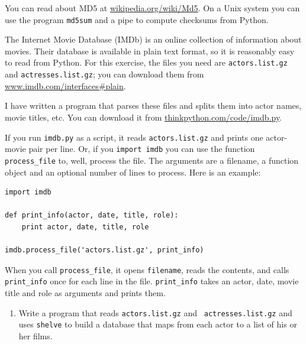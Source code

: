 \documentclass[10pt]{book}
\begin{document}
{\begin{ex}
\begin{enumerate}
You can read about MD5 at \url{wikipedia.org/wiki/Md5}.  On
a Unix system you can use the program {\tt md5sum} and a pipe to
compute checksums from Python.


\end{enumerate}

\end{ex}


\begin{ex}


The Internet Movie Database (IMDb) is an online collection of
information about movies.  Their database is available
in plain text format, so it is reasonably easy to read from
Python.  For this exercise, the files you need
are {\tt actors.list.gz} and {\tt actresses.list.gz}; you
can download them from \url{www.imdb.com/interfaces#plain}.


I have written a program that parses these files and
splits them into actor names, movie titles, etc.  You can
download it from \url{thinkpython.com/code/imdb.py}.

If you run {\tt imdb.py} as a script, it reads {\tt actors.list.gz}
and prints one actor-movie pair per line.  Or, if you {\tt import
imdb} you can use the function \verb"process_file" to, well,
process the file.  The arguments are a filename, a function
object and an optional number of lines to process.  Here is
an example:

\beforeverb
\begin{verbatim}
import imdb

def print_info(actor, date, title, role):
    print actor, date, title, role

imdb.process_file('actors.list.gz', print_info)
\end{verbatim}
\afterverb

When you call \verb"process_file", it opens {\tt filename}, reads the
contents, and calls \verb"print_info" once for each line in the file.
\verb"print_info" takes an actor, date, movie title and role as
arguments and prints them.

\begin{enumerate}

\item Write a program that reads {\tt actors.list.gz} and {\tt
  actresses.list.gz} and uses {\tt shelve} to build a database
that maps from each actor to a list of his or her films.


\end{enumerate}
\end{ex}}
\end{document}
